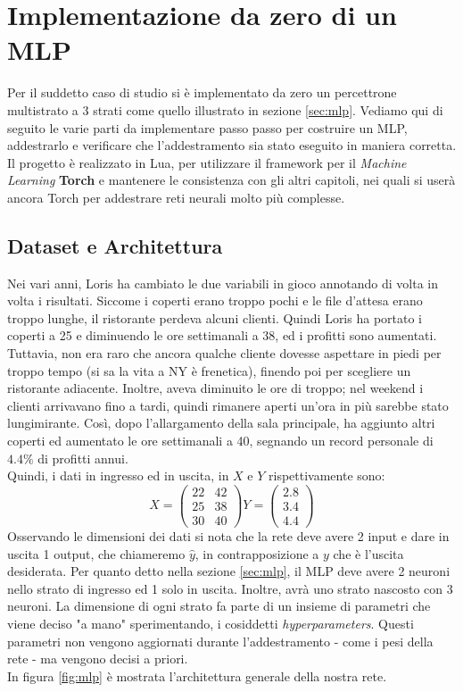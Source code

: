 \section{Implementazione da zero di un MLP}
Per il suddetto caso di studio si è implementato da zero un percettrone multistrato a 3 strati come quello illustrato in sezione \ref{sec:mlp}. Vediamo qui di seguito le varie parti da implementare passo passo per costruire un MLP, addestrarlo e verificare che l'addestramento sia stato eseguito in maniera corretta. Il progetto è realizzato in Lua, per utilizzare il framework per il \emph{Machine Learning} \textbf{Torch} e mantenere le consistenza con gli altri capitoli, nei quali si userà ancora Torch per addestrare reti neurali molto più complesse. 
\subsection{Dataset e Architettura}
Nei vari anni, Loris ha cambiato le due variabili in gioco annotando di volta in volta i risultati. Siccome i coperti erano troppo pochi e le file d'attesa erano troppo lunghe, il ristorante perdeva alcuni clienti. Quindi Loris ha portato i coperti a 25 e diminuendo le ore settimanali a 38, ed i profitti sono aumentati. Tuttavia, non era raro che ancora qualche cliente dovesse aspettare in piedi per troppo tempo (si sa la vita a NY è frenetica), finendo poi per scegliere un ristorante adiacente. Inoltre, aveva diminuito le ore di troppo; nel weekend i clienti arrivavano fino a tardi, quindi rimanere aperti un'ora in più sarebbe stato lungimirante. Così, dopo l'allargamento della sala principale, ha aggiunto altri coperti ed aumentato le ore settimanali a 40, segnando un record personale di $4.4\%$ di profitti annui. \\

Quindi, i dati in ingresso ed in uscita, in $X$ e $Y$ rispettivamente sono:
\[ 
X = \begin{pmatrix}
22 & 42\\ 
25 & 38 \\ 
30 & 40
\end{pmatrix} 
%
Y = \begin{pmatrix}
2.8\\ 
3.4 \\ 
4.4
\end{pmatrix} 
\]
Osservando le dimensioni dei dati si nota che la rete deve avere 2 input e dare in uscita 1 output, che chiameremo $\hat{y}$, in contrapposizione a $y$ che è l'uscita desiderata. Per quanto detto nella sezione \ref{sec:mlp}, il MLP deve avere 2 neuroni nello strato di ingresso ed 1 solo in uscita. Inoltre, avrà uno strato nascosto con 3 neuroni. La dimensione di ogni strato fa parte di un insieme di parametri che viene deciso "a mano" sperimentando, i cosiddetti \emph{hyperparameters}. Questi parametri non vengono aggiornati durante l'addestramento - come i pesi della rete - ma vengono decisi a priori. \\In figura \ref{fig:mlp} è mostrata l'architettura generale della nostra rete. 

